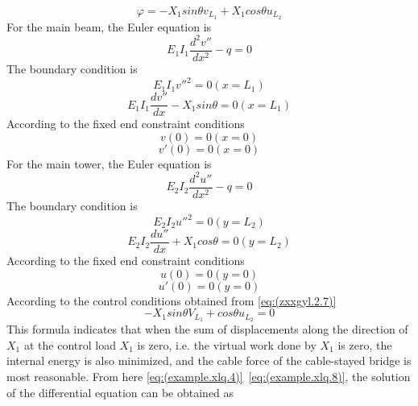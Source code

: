 \begin{equation} \label{eq:(example.xlq.4)}    
\varphi=-X_1 sin\theta v_{L_1}+X_1 cos\theta u_{L_2}
\end{equation}
For the main beam, the Euler equation is
\begin{equation}\label{eq:(example.xlq.5)}
E_1 I_1\frac{d^2 v''}{dx^2}-q=0
\end{equation}
The boundary condition is
\begin{equation}\label{eq:(example.xlq.6)}
E_1 I_1 v''^2=0 (x=L_1)
\end{equation}
\begin{equation}\label{eq:(example.xlq.7)}
E_1 I_1\frac{dv''} {dx}-X_1  sin\theta=0 (x=L_1)
\end{equation}
According to the fixed end constraint conditions
\begin{equation}\label{eq:(example.xlq.8)}
v(0)=0 (x=0)
\end{equation}
\begin{equation}\label{eq:(example.xlq.9)}
v'(0)=0 (x=0)
\end{equation}
For the main tower, the Euler equation is
\begin{equation}\label{eq:(5.jxz.10)}
E_2 I_2\frac{d^2 u''}{dx^2}-q=0
\end{equation}
The boundary condition is
\begin{equation}\label{eq:(5.jxz.11)}
E_2 I_2 u''^2=0 (y=L_2)
\end{equation}
\begin{equation}\label{eq:(5.jxz.12)}
E_2 I_2\frac{du''}{dx}+X_1 cos\theta=0 (y=L_2)
\end{equation}
According to the fixed end constraint conditions
\begin{equation}\label{eq:(5.jxz.13)}
u(0)=0 (y=0)
\end{equation}
\begin{equation}\label{eq:(5.jxz.14)}
u'(0)=0 (y=0)
\end{equation}
According to the control conditions obtained from \ref{eq:(zxxgyl.2.7)}
\begin{equation}\label{eq:(5.jxz.15)}
-X_1 sin\theta V_{L_1} +cos\theta u_{L_2}=0 
\end{equation}
This formula indicates that when the sum of displacements along the direction of $ X_1 $ at the control load $ X_1 $ is zero, i.e. the virtual work done by $ X_1 $ is zero, the internal energy is also minimized, and the cable force of the cable-stayed bridge is most reasonable.
From here \ref{eq:(example.xlq.4)}~\ref{eq:(example.xlq.8)}, the solution of the differential equation can be obtained as
